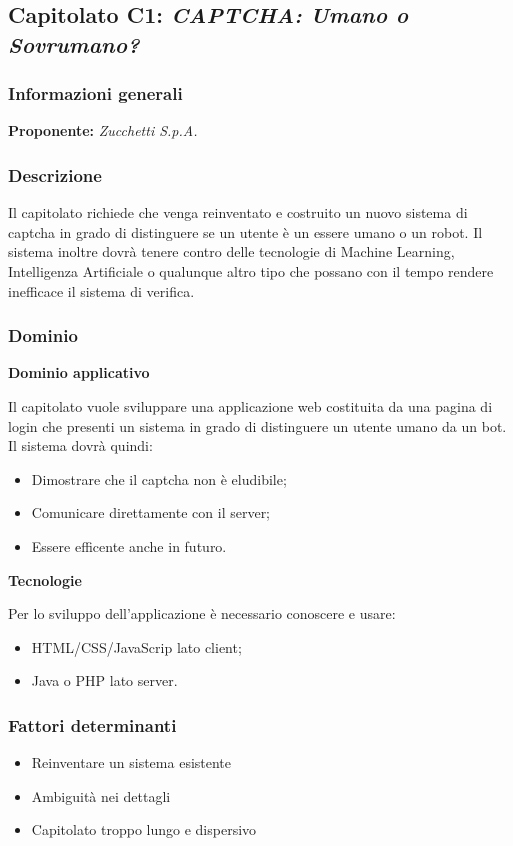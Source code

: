 \subsection{Capitolato C1: \textit{CAPTCHA: Umano o Sovrumano?}}

\subsubsection{Informazioni generali}

\textbf{Proponente:} \textit{Zucchetti S.p.A.}
\subsubsection{Descrizione}
Il capitolato richiede che venga reinventato e costruito un nuovo sistema di captcha in grado di distinguere se un utente è un essere umano o un robot. Il sistema inoltre dovrà tenere contro delle tecnologie di Machine Learning, Intelligenza Artificiale o qualunque altro tipo che possano con il tempo
rendere inefficace il sistema di verifica.  %

\subsubsection{Dominio}

\textbf{Dominio applicativo}

Il capitolato vuole sviluppare una applicazione web costituita da una pagina di login che presenti un sistema in grado di distinguere un utente umano da un bot.
Il sistema dovrà quindi:
\begin{itemize}
    \item Dimostrare che il captcha non è eludibile;
    \item Comunicare direttamente con il server;
    \item Essere efficente anche in futuro.
\end{itemize}

\textbf{Tecnologie}

Per lo sviluppo dell'applicazione è necessario conoscere e usare:
\begin{itemize}
    \item HTML/CSS/JavaScrip lato client;
    \item Java o PHP lato server.
\end{itemize}


\subsubsection{Fattori determinanti}
\begin{itemize}
    \item Reinventare un sistema esistente
    \item Ambiguità nei dettagli
    \item Capitolato troppo lungo e dispersivo
\end{itemize}

